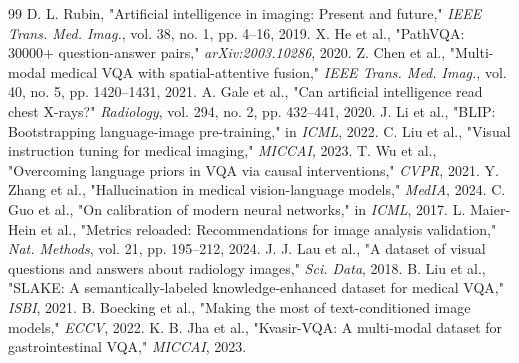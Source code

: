 \documentclass[journal]{IEEEtran}
\begin{document}
\begin{thebibliography}{99}
 D. L. Rubin, "Artificial intelligence in imaging: Present and future," \textit{IEEE Trans. Med. Imag.}, vol. 38, no. 1, pp. 4--16, 2019.
 X. He et al., "PathVQA: 30000+ question-answer pairs," \textit{arXiv:2003.10286}, 2020.
 Z. Chen et al., "Multi-modal medical VQA with spatial-attentive fusion," \textit{IEEE Trans. Med. Imag.}, vol. 40, no. 5, pp. 1420--1431, 2021.
 A. Gale et al., "Can artificial intelligence read chest X-rays?" \textit{Radiology}, vol. 294, no. 2, pp. 432--441, 2020.
 J. Li et al., "BLIP: Bootstrapping language-image pre-training," in \textit{ICML}, 2022.
 C. Liu et al., "Visual instruction tuning for medical imaging," \textit{MICCAI}, 2023.
 T. Wu et al., "Overcoming language priors in VQA via causal interventions," \textit{CVPR}, 2021.
 Y. Zhang et al., "Hallucination in medical vision-language models," \textit{MedIA}, 2024.
 C. Guo et al., "On calibration of modern neural networks," in \textit{ICML}, 2017.
 L. Maier-Hein et al., "Metrics reloaded: Recommendations for image analysis validation," \textit{Nat. Methods}, vol. 21, pp. 195--212, 2024.
 J. J. Lau et al., "A dataset of visual questions and answers about radiology images," \textit{Sci. Data}, 2018.
 B. Liu et al., "SLAKE: A semantically-labeled knowledge-enhanced dataset for medical VQA," \textit{ISBI}, 2021.
 B. Boecking et al., "Making the most of text-conditioned image models," \textit{ECCV}, 2022.
 K. B. Jha et al., "Kvasir-VQA: A multi-modal dataset for gastrointestinal VQA," \textit{MICCAI}, 2023.
\end{thebibliography}
\end{document}
